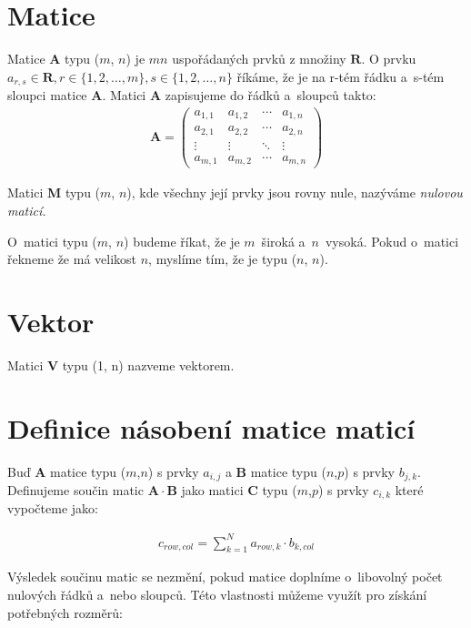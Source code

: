 

\section{Matice}

Matice \textbf{A} typu ($m$, $n$) je $m n$ uspořádaných prvků z množiny $\mathbf{R}$. O prvku $a_{r,s} \in \mathbf{R}, r \in \{1,2,\hdots,m\},s \in \{1,2,\hdots,n\}$ říkáme, že je na r-tém řádku a~s-tém sloupci matice \textbf{A}. Matici \textbf{A} zapisujeme do řádků a~sloupců takto:
\begin{align}
\mathbf{A}=\begin{pmatrix}
a_{1,1} & a_{1,2} & \cdots & a_{1,n} \\
a_{2,1} & a_{2,2} & \cdots & a_{2,n} \\
\vdots  & \vdots  & \ddots & \vdots  \\
a_{m,1} & a_{m,2} & \cdots & a_{m,n}
\end{pmatrix}
\end{align}

Matici \textbf{M} typu ($m$, $n$), kde všechny její prvky jsou rovny nule, nazýváme \textit{nulovou maticí.}

O~matici typu ($m$, $n$) budeme říkat, že je $m$~široká a~$n$~vysoká. Pokud o~matici řekneme že má velikost $n$, myslíme tím, že je typu ($n$, $n$).

\section{Vektor}

Matici \textbf{V} typu (1, n) nazveme vektorem.

\section{Definice násobení matice maticí}

Buď \textbf{A} matice typu ($m$,$n$) s prvky $a_{i,j}$ a \textbf{B} matice typu ($n$,$p$) s prvky $b_{j,k}$. Definujeme součin matic $\mathbf{A} \cdot \mathbf{B}$ jako matici \textbf{C} typu ($m$,$p$) s prvky $c_{i,k}$ které vypočteme jako:

\begin{align}
c_{row,col}=\sum_{k=1}^{N} a_{row,k} \cdot b_{k,col}
\end{align}

Výsledek součinu matic se nezmění, pokud matice doplníme o~libovolný počet nulových řádků a~nebo sloupců. Této vlastnosti můžeme využít pro získání potřebných rozměrů:

